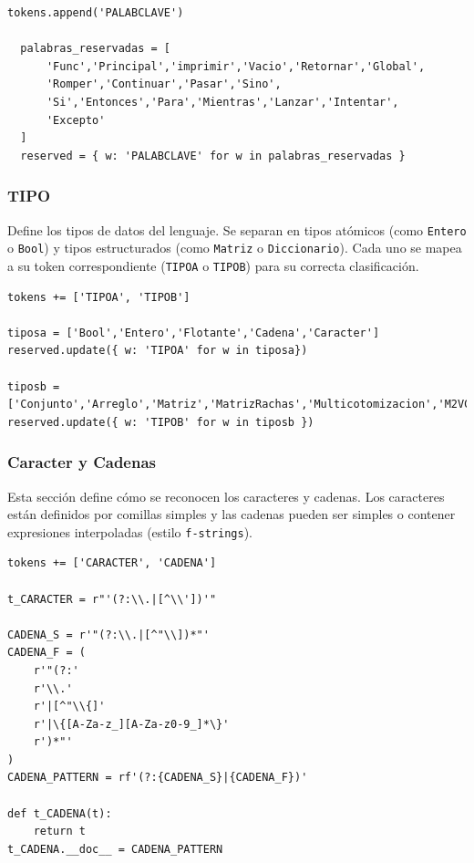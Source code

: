 \documentclass{article}
\begin{document}
\begin{lstlisting}[style=mypython]
  tokens.append('PALABCLAVE')

  palabras_reservadas = [
      'Func','Principal','imprimir','Vacio','Retornar','Global',
      'Romper','Continuar','Pasar','Sino',
      'Si','Entonces','Para','Mientras','Lanzar','Intentar',
      'Excepto'
  ]
  reserved = { w: 'PALABCLAVE' for w in palabras_reservadas }
  \end{lstlisting}

\subsubsection{TIPO}

Define los tipos de datos del lenguaje. Se separan en tipos atómicos (como \texttt{Entero} o \texttt{Bool}) y tipos estructurados (como \texttt{Matriz} o \texttt{Diccionario}). Cada uno se mapea a su token correspondiente (\texttt{TIPOA} o \texttt{TIPOB}) para su correcta clasificación.

\begin{lstlisting}[style=mypython]
tokens += ['TIPOA', 'TIPOB']

tiposa = ['Bool','Entero','Flotante','Cadena','Caracter']
reserved.update({ w: 'TIPOA' for w in tiposa})

tiposb = ['Conjunto','Arreglo','Matriz','MatrizRachas','Multicotomizacion','M2VClasificacion','Diccionario']
reserved.update({ w: 'TIPOB' for w in tiposb })
\end{lstlisting}

\subsubsection{Caracter y Cadenas}

Esta sección define cómo se reconocen los caracteres y cadenas. Los caracteres están definidos por comillas simples y las cadenas pueden ser simples o contener expresiones interpoladas (estilo \texttt{f-strings}).

\begin{lstlisting}[style=mypython]
tokens += ['CARACTER', 'CADENA']

t_CARACTER = r"'(?:\\.|[^\\'])'"

CADENA_S = r'"(?:\\.|[^"\\])*"'
CADENA_F = (
    r'"(?:'
    r'\\.'
    r'|[^"\\{]'
    r'|\{[A-Za-z_][A-Za-z0-9_]*\}'
    r')*"'
)
CADENA_PATTERN = rf'(?:{CADENA_S}|{CADENA_F})'

def t_CADENA(t):
    return t
t_CADENA.__doc__ = CADENA_PATTERN
\end{lstlisting}
\end{document}
